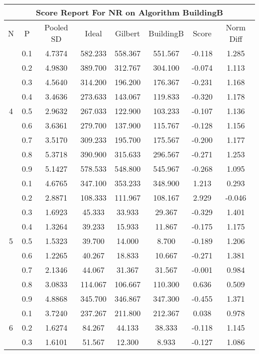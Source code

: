\documentclass[11pt,a4paper]{report}
\begin{document}
\begin{longtable}{ | c | c || c | c | c | c | c | c | }
\hline
\multicolumn{8}{|c|}{ Score Report For NR on Algorithm BuildingB} \\
\hline
N & P & Pooled SD &  Ideal &  Gilbert & BuildingB  & Score & Norm Diff \\
 \hline
 \hline
 \endhead
\multirow{9}{*}{4} & 0.1 & 4.7374 & 582.233 & 558.367 & 551.567 & -0.118 & 1.285 \\
 & 0.2 & 4.9830 & 389.700 & 312.767 & 304.100 & -0.074 & 1.113 \\
 & 0.3 & 4.5640 & 314.200 & 196.200 & 176.367 & -0.231 & 1.168 \\
 & 0.4 & 3.4636 & 273.633 & 143.067 & 119.833 & -0.320 & 1.178 \\
 & 0.5 & 2.9632 & 267.033 & 122.900 & 103.233 & -0.107 & 1.136 \\
 & 0.6 & 3.6361 & 279.700 & 137.900 & 115.767 & -0.128 & 1.156 \\
 & 0.7 & 3.5170 & 309.233 & 195.700 & 175.567 & -0.200 & 1.177 \\
 & 0.8 & 5.3718 & 390.900 & 315.633 & 296.567 & -0.271 & 1.253 \\
 & 0.9 & 5.1427 & 578.533 & 548.800 & 545.967 & -0.268 & 1.095 \\
 \hline
\multirow{9}{*}{5} & 0.1 & 4.6765 & 347.100 & 353.233 & 348.900 & 1.213 & 0.293 \\
 & 0.2 & 2.8871 & 108.333 & 111.967 & 108.167 & 2.929 & -0.046 \\
 & 0.3 & 1.6923 & 45.333 & 33.933 & 29.367 & -0.329 & 1.401 \\
 & 0.4 & 1.3264 & 39.233 & 15.933 & 11.867 & -0.175 & 1.175 \\
 & 0.5 & 1.5323 & 39.700 & 14.000 & 8.700 & -0.189 & 1.206 \\
 & 0.6 & 1.2265 & 40.267 & 18.833 & 10.667 & -0.271 & 1.381 \\
 & 0.7 & 2.1346 & 44.067 & 31.367 & 31.567 & -0.001 & 0.984 \\
 & 0.8 & 3.0833 & 114.067 & 106.667 & 110.300 & 0.636 & 0.509 \\
 & 0.9 & 4.8868 & 345.700 & 346.867 & 347.300 & -0.455 & 1.371 \\
 \hline
\multirow{9}{*}{6} & 0.1 & 3.7240 & 237.267 & 211.800 & 212.367 & 0.038 & 0.978 \\
 & 0.2 & 1.6274 & 84.267 & 44.133 & 38.333 & -0.118 & 1.145 \\
 & 0.3 & 1.6101 & 51.567 & 12.300 & 8.933 & -0.127 & 1.086 \\

\end{longtable}
\end{document}

